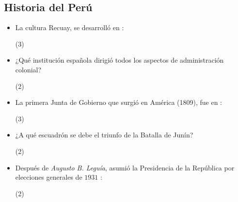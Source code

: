 \documentclass[10pt, twocolumn, landscape, a4paper]{article}
\begin{document}
\subsection*{Historia del Perú}
\begin{itemize}
\item{La cultura Recuay, se desarrolló en :
\begin{tasks}(3)
\end{tasks}
}
\item{¿Qué institución española dirigió todos los aspectos de administración colonial?
\begin{tasks}(2)
\end{tasks}
}
\item{La primera Junta de Gobierno que surgió en América (1809), fue en :
\begin{tasks}(3)
\end{tasks}
}
\item{¿A qué escuadrón se debe el triunfo de la Batalla de Junín?
\begin{tasks}(2)
\end{tasks}
}
\item{Después de \textit{Augusto B. Leguía}, asumió la Presidencia de la República por elecciones generales de $1931$ :
\begin{tasks}(2)
\end{tasks}
}
\end{itemize}
\end{document}
